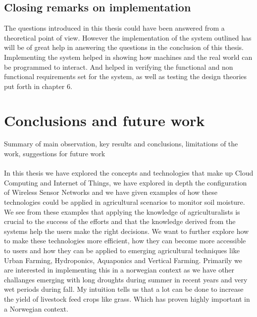 \documentclass[]{uiophd}
\begin{document}
\section{Closing remarks on implementation}
The questions introduced in this thesis could have been answered from a theoretical point of view. However the implementation of the system outlined has will be of great help in answering the questions in the conclusion of this thesis. Implementing the system helped in showing how machines and the real world can be programmed to interact. And helped in verifying the functional and non functional requirements set for the system, as well as testing the design theories put forth in chapter 6.

\chapter{Conclusions and future work}

Summary of main observation, key results and conclusions, limitations of the work, suggestions for future work
\\\\
In this thesis we have explored the concepts and technologies that make up Cloud Computing and Internet of Things, we have explored in depth the configuration of Wireless Sensor Networks and we have given examples of how these technologies could be applied in agricultural scenarios to monitor soil moisture. We see from these examples that applying the knowledge of agriculturalists is crucial to the success of the efforts and that the knowledge derived from the systems help the users make the right decisions. We want to further explore how to make these technologies more efficient, how they can become more accessible to users and how they can be applied to emerging agricultural techniques like Urban Farming, Hydroponics, Aquaponics and Vertical Farming. Primarily we are interested in implementing this in a norwegian context as we have other challanges emerging with long droughts during summer in recent years and very wet periods during fall. My intuition tells us that a lot can be done to increase the yield of livestock feed crops like grass. Which has proven highly important in a Norwegian context.
\end{document}
